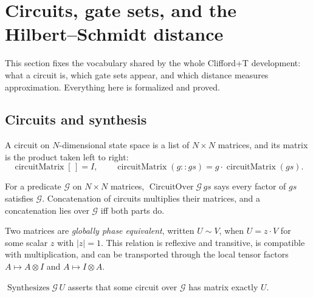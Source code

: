\section{Circuits, gate sets, and the Hilbert--Schmidt distance}
\label{sec:circuits}

This section fixes the vocabulary shared by the whole Clifford+T development:
what a circuit is, which gate sets appear, and which distance measures
approximation.  Everything here is formalized and proved.

\subsection{Circuits and synthesis}

\begin{definition}
  \label{def:circuit_matrix}
  \leanok
  A circuit on $N$-dimensional state space is a list of $N \times N$ matrices,
  and its matrix is the product taken left to right:
  \[
    \operatorname{circuitMatrix}[\,] = I, \qquad
    \operatorname{circuitMatrix}(g :: gs)
      = g \cdot \operatorname{circuitMatrix}(gs).
  \]
\end{definition}

\begin{definition}
  \label{def:circuit_over}
  \leanok
  For a predicate $\mathcal{G}$ on $N \times N$ matrices,
  $\operatorname{CircuitOver} \mathcal{G}\, gs$ says every factor of $gs$
  satisfies $\mathcal{G}$.  Concatenation of circuits multiplies their
  matrices, and a concatenation lies over $\mathcal{G}$ iff both parts do.
\end{definition}

\begin{definition}
  \label{def:global_phase}
  \leanok
  Two matrices are \emph{globally phase equivalent}, written $U \sim V$, when
  $U = z \cdot V$ for some scalar $z$ with $\lvert z \rvert = 1$.  This
  relation is reflexive and transitive, is compatible with multiplication, and
  can be transported through the local tensor factors $A \mapsto A \otimes I$
  and $A \mapsto I \otimes A$.
\end{definition}

\begin{definition}
  \label{def:synthesizes}
  \leanok
  $\operatorname{Synthesizes} \mathcal{G}\, U$ asserts that some circuit over
  $\mathcal{G}$ has matrix exactly $U$.
\end{definition}

